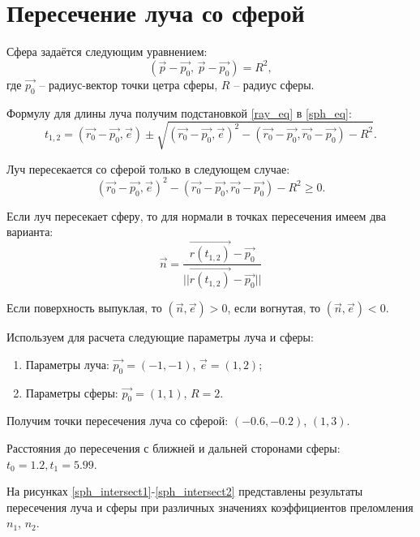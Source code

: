 \section{Пересечение луча со сферой}
{
	Сфера задаётся следующим уравнением:
	\begin{equation}\label{sph_eq}
		(\vec{p} - \vec{p_0},\, \vec{p} - \vec{p_0}) = R^2,
	\end{equation}
	где $\vec{p_0}$ -- радиус-вектор точки цетра сферы, $R$ -- радиус сферы.
	
	Формулу для длины луча получим подстановкой \eqref{ray_eq} в \eqref{sph_eq}:
	\begin{equation}\label{ray_sphere_intersect}
	t_{1,2} = (\vec{r_0} - \vec{p_0}, \vec{e}) \pm \sqrt{(\vec{r_0} - \vec{p_0}, \vec{e})^2 - (\vec{r_0} - \vec{p_0}, \vec{r_0} - \vec{p_0}) - R^2}.
	\end{equation}
	
	Луч пересекается со сферой только в следующем случае:
	\begin{equation}\label{sph_intersect_criteria}
	(\vec{r_0} - \vec{p_0}, \vec{e})^2 - (\vec{r_0} - \vec{p_0}, \vec{r_0} - \vec{p_0}) - R^2 \geq 0.
	\end{equation}
	
	Если луч пересекает сферу, то для нормали в точках пересечения имеем два варианта:
	\begin{equation}\label{sph_normal}
	\vec{n} = \frac{\vec{r(t_{1,2})} - \vec{p_0}}{||\vec{r(t_{1,2})} - \vec{p_0}||}
	\end{equation}
	
	Если поверхность выпуклая, то $(\vec{n}, \vec{e}) > 0$, если вогнутая, то $(\vec{n}, \vec{e}) < 0$.
	
	Используем для расчета следующие параметры луча и сферы:
	\begin{enumerate}
	\item Параметры луча: $\vec{p_0} = (-1, -1)$, $\vec{e} = (1, 2)$;
	\item Параметры сферы: $\vec{p_0} = (1, 1)$, $R = 2$.
	\end{enumerate}
	
	Получим точки пересечения луча со сферой: $(-0.6, -0.2)$, $(1, 3)$.
	
	Расстояния до пересечения с ближней и дальней сторонами сферы: ${t_0 = 1.2, t_1 = 5.99}$.
	
	На рисунках \ref{sph_intersect1}-\ref{sph_intersect2} представлены результаты пересечения луча и сферы при различных значениях коэффициентов преломления $n_1$, $n_2$.
	
}
